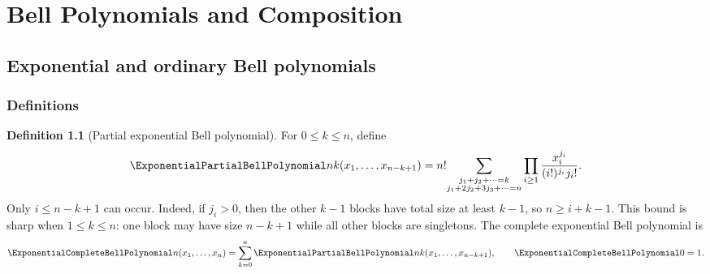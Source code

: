 \documentclass[11pt,a4paper,oneside,openany]{book}
\theoremstyle{definition}
\newtheorem{definition}[theorem]{Definition}
\theoremstyle{remark}
\begin{document}
\part{Bell Polynomials and Composition}

\chapter{Exponential and ordinary Bell polynomials}

\section{Definitions}
\begin{definition}[Partial exponential Bell polynomial]
For $0\le k\le n$, define
\begin{equation}\label{eq:partial-bell-definition}
 \ExponentialPartialBellPolynomial nk(x_1,\ldots,x_{n-k+1})
 =n!\!\sum_{\substack{j_1+j_2+\cdots=k\\
                       j_1+2j_2+3j_3+\cdots=n}}
 \prod_{i\ge1}\frac{x_i^{j_i}}{(i!)^{j_i}j_i!}.
\end{equation}
Only $i\le n-k+1$ can occur.  Indeed, if $j_i>0$, then the other $k-1$
blocks have total size at least $k-1$, so $n\ge i+k-1$.  This bound is
sharp when $1\le k\le n$: one block may have size $n-k+1$ while all other
blocks are singletons.
The complete exponential Bell polynomial is
\begin{equation}\label{eq:complete-bell-definition}
 \ExponentialCompleteBellPolynomial n(x_1,\ldots,x_n)=\sum_{k=0}^{n}\ExponentialPartialBellPolynomial nk(x_1,\ldots,x_{n-k+1}),
 \qquad \ExponentialCompleteBellPolynomial0=1.
\end{equation}
\end{definition}
\end{document}
